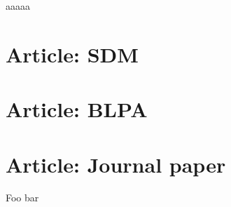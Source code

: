 \documentclass[doctoral,utf8,lot,loar,shortloft,index]{jydiss}
\begin{document}
\preface

 aaaaa

\acknowledgements



\mainmatter









% 

\chapter{Article: SDM}

 
\chapter{Article: BLPA}

  
\chapter{Article: Journal paper}






\tailmatter
\finnishsummary
Foo bar


%

\backmatter


\printindex
\end{document}
